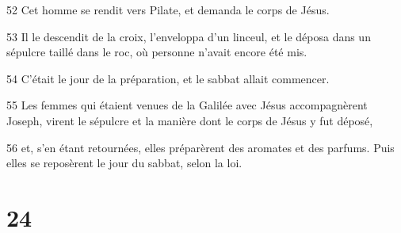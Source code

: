 \par 52 Cet homme se rendit vers Pilate, et demanda le corps de Jésus.
\par 53 Il le descendit de la croix, l'enveloppa d'un linceul, et le déposa dans un sépulcre taillé dans le roc, où personne n'avait encore été mis.
\par 54 C'était le jour de la préparation, et le sabbat allait commencer.
\par 55 Les femmes qui étaient venues de la Galilée avec Jésus accompagnèrent Joseph, virent le sépulcre et la manière dont le corps de Jésus y fut déposé,
\par 56 et, s'en étant retournées, elles préparèrent des aromates et des parfums. Puis elles se reposèrent le jour du sabbat, selon la loi.

\chapter{24}

